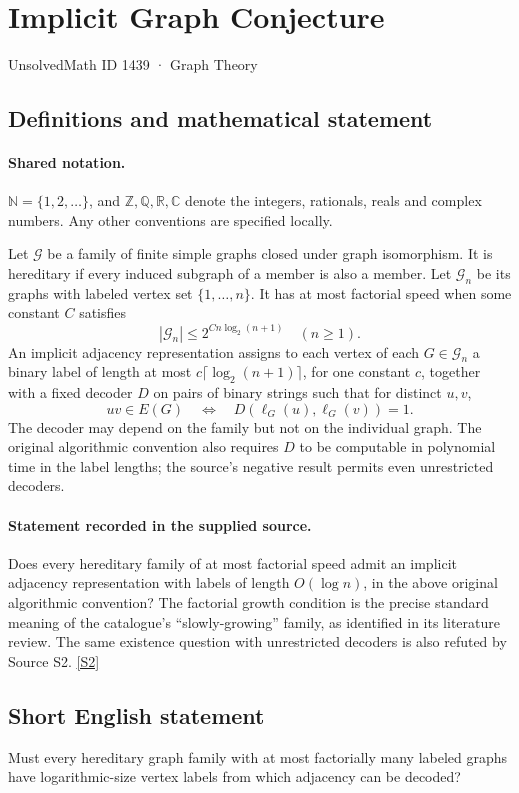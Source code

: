 \documentclass[11pt]{article}
\newcommand{\sref}[2]{\hyperlink{source:#1:#2}{[S#2]}}
\begin{document}
\setcounter{section}{1438}
\section{Implicit Graph Conjecture}\label{1439}
{\small\sffamily UnsolvedMath ID 1439 · Graph Theory}
\subsection{Definitions and mathematical statement}

\paragraph{Shared notation.}$\mathbb N=\{1,2,\ldots\}$, and $\mathbb Z,\mathbb Q,\mathbb R,\mathbb C$ denote the integers, rationals, reals and complex numbers. Any other conventions are specified locally.


Let $\mathcal G$ be a family of finite simple graphs closed under graph isomorphism. It is hereditary if every induced subgraph of a member is also a member. Let $\mathcal G_n$ be its graphs with labeled vertex set $\{1,\ldots,n\}$. It has at most factorial speed when some constant $C$ satisfies
\[
 |\mathcal G_n|\le 2^{C n\log_2(n+1)}\quad(n\ge1).
\]
An implicit adjacency representation assigns to each vertex of each $G\in\mathcal G_n$ a binary label of length at most $c\lceil\log_2(n+1)\rceil$, for one constant $c$, together with a fixed decoder $D$ on pairs of binary strings such that for distinct $u,v$,
\[
 uv\in E(G)\quad\Longleftrightarrow\quad D(\ell_G(u),\ell_G(v))=1.
\]
The decoder may depend on the family but not on the individual graph. The original algorithmic convention also requires $D$ to be computable in polynomial time in the label lengths; the source's negative result permits even unrestricted decoders.
\paragraph{Statement recorded in the supplied source.}
Does every hereditary family of at most factorial speed admit an implicit adjacency representation with labels of length $O(\log n)$, in the above original algorithmic convention? The factorial growth condition is the precise standard meaning of the catalogue's “slowly-growing” family, as identified in its literature review. The same existence question with unrestricted decoders is also refuted by Source S2. \sref{1439}{2}
\subsection{Short English statement}
Must every hereditary graph family with at most factorially many labeled graphs have logarithmic-size vertex labels from which adjacency can be decoded?
\end{document}
